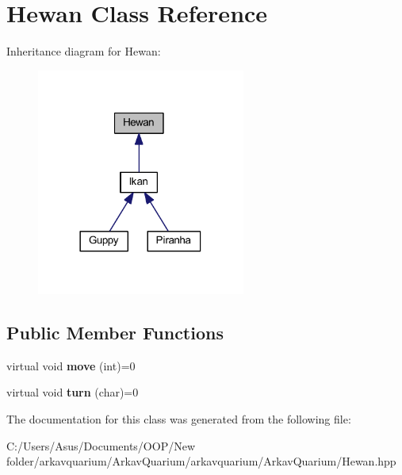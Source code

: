 \hypertarget{class_hewan}{}\section{Hewan Class Reference}
\label{class_hewan}


Inheritance diagram for Hewan\+:\nopagebreak
\begin{figure}[H]
\begin{center}
\leavevmode
\includegraphics[width=194pt]{class_hewan__inherit__graph}
\end{center}
\end{figure}
\subsection*{Public Member Functions}
\begin{DoxyCompactItemize}
\item 
\mbox{\label{class_hewan_a5eee39533ecc3e62eb0c1446909679a7}} 
virtual void {\bfseries move} (int)=0
\item 
\mbox{\label{class_hewan_a41bb691cef05f54097c61a63e1e32550}} 
virtual void {\bfseries turn} (char)=0
\end{DoxyCompactItemize}


The documentation for this class was generated from the following file\+:\begin{DoxyCompactItemize}
\item 
C\+:/\+Users/\+Asus/\+Documents/\+O\+O\+P/\+New folder/arkavquarium/\+Arkav\+Quarium/arkavquarium/\+Arkav\+Quarium/Hewan.\+hpp\end{DoxyCompactItemize}

